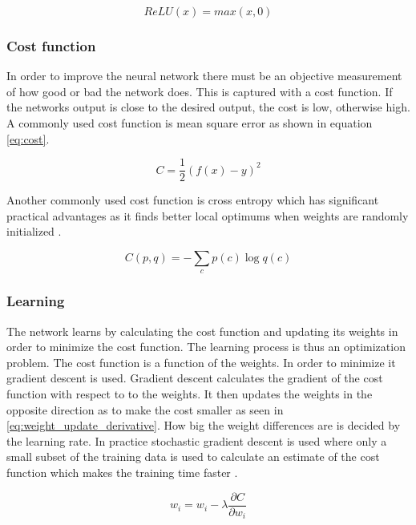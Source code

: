 \documentclass{kththesis}
\begin{document}
\begin{equation}
\label{eq:relu}
ReLU(x)=max(x,0)
\end{equation}


\subsubsection{Cost function}
In order to  improve the neural network  there must be an objective measurement of how good or bad the network does. This is captured with a cost function. If the networks output is close to the desired output, the cost is low, otherwise high. A commonly used cost function is mean square error as shown in equation \ref{eq:cost}. 

\begin{equation}
\label{eq:cost}
C =\frac{1}{2}(f(x)-y)^2
\end{equation}

Another commonly used cost function is cross entropy which has significant practical advantages as it finds better local optimums when weights are randomly initialized \cite{golik2013cross, kline2005revisiting}.

\begin{equation}
\label{eq:cross_entropy}
C(p,q) = -\sum_{c}p(c)\log{q(c)}
\end{equation}

\subsubsection{Learning}
The network learns by calculating the cost function and updating its weights in order to minimize the cost function. The learning process is thus an optimization problem.  The cost function is a function of the weights. In order to minimize it gradient descent is used. Gradient descent  calculates the gradient of the cost function with respect to to the weights. It then updates the weights in the opposite direction as to make the cost smaller as seen in \ref{eq:weight_update_derivative}. How big the weight differences are is  decided by the learning rate. In practice stochastic gradient descent is used where only a small subset of the training data is used to calculate an estimate of the cost function which makes the training time faster \cite{michaelnielsen2015}.

\begin{equation}
\label{eq:weight_update_derivative}
w_i= w_i-\lambda\frac{\partial{C}}{\partial{w_i}}
\end{equation}
\end{document}
